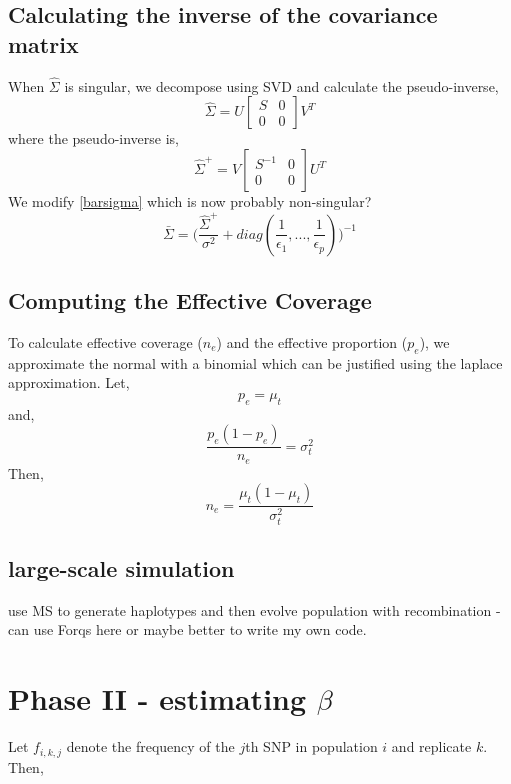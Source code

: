 \documentclass[10pt,a4paper,draft]{article}
\begin{document}
\subsection{Calculating the inverse of the covariance matrix}
When $\hat{\Sigma}$ is singular, we decompose using SVD and calculate the pseudo-inverse,
\begin{equation}
\hat{\Sigma} = U 
\begin{bmatrix} S & 0 \\ 0 & 0 \end{bmatrix} V^T
\end{equation}
where the pseudo-inverse is,
\begin{equation}
\hat{\Sigma}^{+} = V \begin{bmatrix} S^{-1} & 0 \\ 0 & 0 \end{bmatrix} U^T
\end{equation}
We modify \ref{barsigma} which is now probably non-singular?
\begin{equation}
\bar{\Sigma} =  \big(\frac{\hat{\Sigma}^{+}}{\sigma^2} + diag(\frac{1}{\epsilon_1},..., \frac{1}{\epsilon_p})\big)^{-1}
\end{equation}

\subsection{Computing the Effective Coverage}
To calculate effective coverage ($n_e$) and the effective proportion ($p_e$), we approximate the normal with a binomial which can be justified using the laplace approximation.
Let,
\begin{equation} 
p_e = \mu_t
\end{equation}
and,
\begin{equation}
\frac{p_e(1-p_e)}{n_e}= \sigma_t^2
\end{equation}
Then,
\begin{equation}
n_e = \frac{\mu_t(1-\mu_t)}{\sigma_t^2}
\end{equation}

\subsection{large-scale simulation}
use MS to generate haplotypes and then evolve population with recombination - can use Forqs here or maybe better to write my own code.

\section{Phase II - estimating $\beta$}
Let $f_{i,k,j}$ denote the frequency of the $j$th SNP in population $i$ and replicate $k$. Then,
\end{document}
